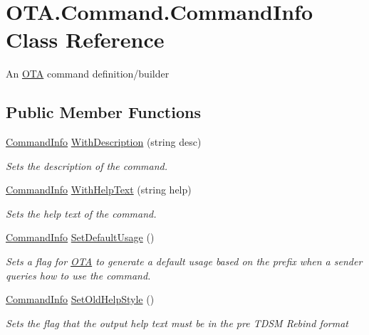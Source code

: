\hypertarget{class_o_t_a_1_1_command_1_1_command_info}{}\section{O\+T\+A.\+Command.\+Command\+Info Class Reference}
\label{class_o_t_a_1_1_command_1_1_command_info}


An \hyperlink{namespace_o_t_a}{O\+T\+A} command definition/builder  


\subsection*{Public Member Functions}
\begin{DoxyCompactItemize}
\item 
\hyperlink{class_o_t_a_1_1_command_1_1_command_info}{Command\+Info} \hyperlink{class_o_t_a_1_1_command_1_1_command_info_a5e1946986761c093f6502e7e6e6e090d}{With\+Description} (string desc)
\begin{DoxyCompactList}\small\item\em Sets the description of the command. \end{DoxyCompactList}\item 
\hyperlink{class_o_t_a_1_1_command_1_1_command_info}{Command\+Info} \hyperlink{class_o_t_a_1_1_command_1_1_command_info_a5e6e33482694024a3f9d6037f063fe8b}{With\+Help\+Text} (string help)
\begin{DoxyCompactList}\small\item\em Sets the help text of the command. \end{DoxyCompactList}\item 
\hyperlink{class_o_t_a_1_1_command_1_1_command_info}{Command\+Info} \hyperlink{class_o_t_a_1_1_command_1_1_command_info_a5b94cc2c1109440759ff866a3b041050}{Set\+Default\+Usage} ()
\begin{DoxyCompactList}\small\item\em Sets a flag for \hyperlink{namespace_o_t_a}{O\+T\+A} to generate a default usage based on the prefix when a sender queries how to use the command. \end{DoxyCompactList}\item 
\hyperlink{class_o_t_a_1_1_command_1_1_command_info}{Command\+Info} \hyperlink{class_o_t_a_1_1_command_1_1_command_info_a3f3d9e3db813063f113923ff3a9db2f4}{Set\+Old\+Help\+Style} ()
\begin{DoxyCompactList}\small\item\em Sets the flag that the output help text must be in the pre T\+D\+S\+M Rebind format \end{DoxyCompactList}\item 

\end{DoxyCompactItemize}
